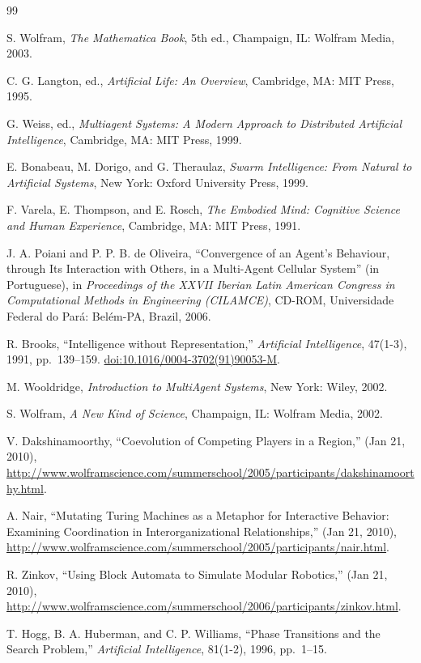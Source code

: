 \documentclass[11pt, a4paper]{article}
\begin{document}
\begin{thebibliography}{99}

 S. Wolfram, \textit{The Mathematica Book}, 5th ed., Champaign, IL: Wolfram Media, 2003.

 C. G. Langton, ed., \textit{Artificial Life: An Overview}, Cambridge, MA: MIT Press, 1995.

 G. Weiss, ed., \textit{Multiagent Systems: A Modern Approach to Distributed Artificial Intelligence}, Cambridge, MA: MIT Press, 1999.

 E. Bonabeau, M. Dorigo, and G. Theraulaz, \textit{Swarm Intelligence: From Natural to Artificial Systems}, New York: Oxford University Press, 1999.

 F. Varela, E. Thompson, and E. Rosch, \textit{The Embodied Mind: Cognitive Science and Human Experience}, Cambridge, MA: MIT Press, 1991.

 J. A. Poiani and P. P. B. de Oliveira, ``Convergence of an Agent's Behaviour, through Its Interaction with Others, in a Multi-Agent Cellular System'' (in Portuguese), in \textit{Proceedings of the XXVII Iberian Latin American Congress in Computational Methods in Engineering (CILAMCE)}, CD-ROM, Universidade Federal do Par\'a: Bel\'em-PA, Brazil, 2006.

 R. Brooks, ``Intelligence without Representation,'' \textit{Artificial Intelligence}, 47(1-3), 1991, pp.~139--159. \href{https://doi.org/10.1016/0004-3702(91)90053-M}{doi:10.1016/0004-3702(91)90053-M}.

 M. Wooldridge, \textit{Introduction to MultiAgent Systems}, New York: Wiley, 2002.

 S. Wolfram, \textit{A New Kind of Science}, Champaign, IL: Wolfram Media, 2002.

 V. Dakshinamoorthy, ``Coevolution of Competing Players in a Region,'' (Jan 21, 2010), \url{http://www.wolframscience.com/summerschool/2005/participants/dakshinamoorthy.html}.

 A. Nair, ``Mutating Turing Machines as a Metaphor for Interactive Behavior: Examining Coordination in Interorganizational Relationships,'' (Jan 21, 2010), \url{http://www.wolframscience.com/summerschool/2005/participants/nair.html}.

 R. Zinkov, ``Using Block Automata to Simulate Modular Robotics,'' (Jan 21, 2010), \url{http://www.wolframscience.com/summerschool/2006/participants/zinkov.html}.

 T. Hogg, B. A. Huberman, and C. P. Williams, ``Phase Transitions and the Search Problem,'' \textit{Artificial Intelligence}, 81(1-2), 1996, pp.~1--15.

\end{thebibliography}
\end{document}
